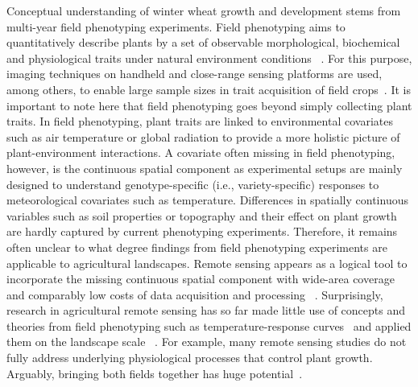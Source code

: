 Conceptual understanding of winter wheat growth and development stems from multi-year field phenotyping experiments. Field phenotyping aims to quantitatively describe plants by a set of observable morphological, biochemical and physiological traits under natural environment conditions ~\citep{walter_plant_2015}. For this purpose, imaging techniques on handheld and close-range sensing platforms are used, among others, to enable large sample sizes in trait acquisition of field crops~\citep{araus_field_2014}. It is important to note here that field phenotyping goes beyond simply collecting plant traits. In field phenotyping, plant traits are linked to environmental covariates such as air temperature or global radiation to provide a more holistic picture of plant-environment interactions. A covariate often missing in field phenotyping, however, is the continuous spatial component as experimental setups are mainly designed to understand genotype-specific (i.e., variety-specific) responses to meteorological covariates such as temperature. Differences in spatially continuous variables such as soil properties or topography and their effect on plant growth are hardly captured by current phenotyping experiments. Therefore, it remains often unclear to what degree findings from field phenotyping experiments are applicable to agricultural landscapes. Remote sensing appears as a logical tool to incorporate the missing continuous spatial component with wide-area coverage and comparably low costs of data acquisition and processing ~\citep{weiss_remote_2020}. Surprisingly, research in agricultural remote sensing has so far made little use of concepts and theories from field phenotyping such as temperature-response curves~\citep{roth_phenomics_2022} and applied them on the landscape scale ~\citep{machwitz_bridging_2021}. For example, many remote sensing studies do not fully address underlying physiological processes that control plant growth. Arguably, bringing both fields together has huge potential~\citep{walter_advances_2022}.

